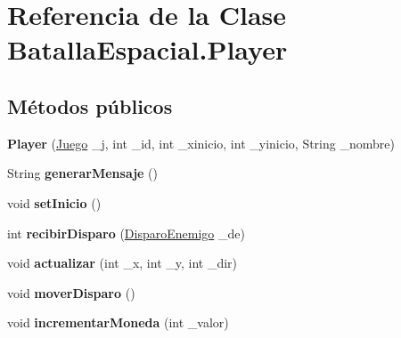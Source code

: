\hypertarget{classBatallaEspacial_1_1Player}{
\section{Referencia de la Clase BatallaEspacial.Player}
\label{classBatallaEspacial_1_1Player}
}
\subsection*{Métodos públicos}
\begin{DoxyCompactItemize}
\item 
\hypertarget{classBatallaEspacial_1_1Player_a02b30d9d53f09e85d6ff481cde85b980}{
{\bfseries Player} (\hyperlink{classBatallaEspacial_1_1Juego}{Juego} \_\-j, int \_\-id, int \_\-xinicio, int \_\-yinicio, String \_\-nombre)}
\label{classBatallaEspacial_1_1Player_a02b30d9d53f09e85d6ff481cde85b980}

\item 
\hypertarget{classBatallaEspacial_1_1Player_aa9adf40570d1ced60965ba32398ce1bb}{
String {\bfseries generarMensaje} ()}
\label{classBatallaEspacial_1_1Player_aa9adf40570d1ced60965ba32398ce1bb}

\item 
\hypertarget{classBatallaEspacial_1_1Player_a9591bd93b0dbce55e6aa444150b46a1d}{
void {\bfseries setInicio} ()}
\label{classBatallaEspacial_1_1Player_a9591bd93b0dbce55e6aa444150b46a1d}

\item 
\hypertarget{classBatallaEspacial_1_1Player_aee74d2ba3a569e9667d5e0396f9f5478}{
int {\bfseries recibirDisparo} (\hyperlink{classBatallaEspacial_1_1DisparoEnemigo}{DisparoEnemigo} \_\-de)}
\label{classBatallaEspacial_1_1Player_aee74d2ba3a569e9667d5e0396f9f5478}

\item 
\hypertarget{classBatallaEspacial_1_1Player_a1e44cdd60bd2315c2f7c01abc08eed81}{
void {\bfseries actualizar} (int \_\-x, int \_\-y, int \_\-dir)}
\label{classBatallaEspacial_1_1Player_a1e44cdd60bd2315c2f7c01abc08eed81}

\item 
\hypertarget{classBatallaEspacial_1_1Player_ab19130e949cc7025184c788d7ee144cb}{
void {\bfseries moverDisparo} ()}
\label{classBatallaEspacial_1_1Player_ab19130e949cc7025184c788d7ee144cb}

\item 
\hypertarget{classBatallaEspacial_1_1Player_a7faea863a5e7870fe17dea9ace5e63e5}{
void {\bfseries incrementarMoneda} (int \_\-valor)}
\label{classBatallaEspacial_1_1Player_a7faea863a5e7870fe17dea9ace5e63e5}


\end{DoxyCompactItemize}
